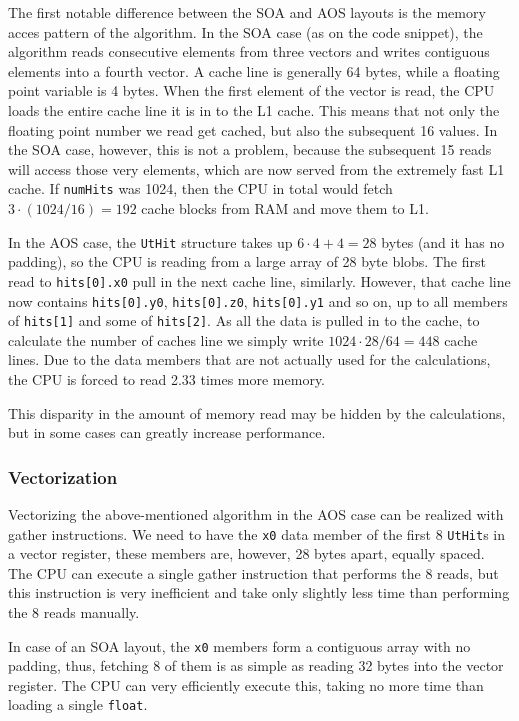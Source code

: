 \documentclass[12pt]{article}
\newcommand{\code}[1]{\texttt{#1}}
\begin{document}
The first notable difference between the SOA and AOS layouts is the memory acces pattern of the algorithm. In the SOA case (as on the code snippet), the algorithm reads consecutive elements from three vectors and writes contiguous elements into a fourth vector. A cache line is generally 64 bytes, while a floating point variable is 4 bytes. When the first element of the vector is read, the CPU loads the entire cache line it is in to the L1 cache. This means that not only the floating point number we read get cached, but also the subsequent 16 values. In the SOA case, however, this is not a problem, because the subsequent 15 reads will access those very elements, which are now served from the extremely fast L1 cache. If \code{numHits} was 1024, then the CPU in total would fetch $3 \cdot (1024/16) = 192$ cache blocks from RAM and move them to L1.

In the AOS case, the \code{UtHit} structure takes up $6 \cdot 4 + 4 = 28$ bytes (and it has no padding), so the CPU is reading from a large array of 28 byte blobs. The first read to \code{hits[0].x0} pull in the next cache line, similarly. However, that cache line now contains \code{hits[0].y0}, \code{hits[0].z0}, \code{hits[0].y1} and so on, up to all members of \code{hits[1]} and some of \code{hits[2]}. As all the data is pulled in to the cache, to calculate the number of caches line we simply write $1024 \cdot 28 / 64 = 448$ cache lines. Due to the data members that are not actually used for the calculations, the CPU is forced to read 2.33 times more memory.

This disparity in the amount of memory read may be hidden by the calculations, but in some cases can greatly increase performance.


\subsubsection{Vectorization}

Vectorizing the above-mentioned algorithm in the AOS case can be realized with gather instructions. We need to have the \code{x0} data member of the first 8 \code{UtHit}s in a vector register, these members are, however, 28 bytes apart, equally spaced. The CPU can execute a single gather instruction that performs the 8 reads, but this instruction is very inefficient and take only slightly less time than performing the 8 reads manually.

In case of an SOA layout, the \code{x0} members form a contiguous array with no padding, thus, fetching 8 of them is as simple as reading 32 bytes into the vector register. The CPU can very efficiently execute this, taking no more time than loading a single \code{float}.
\end{document}
